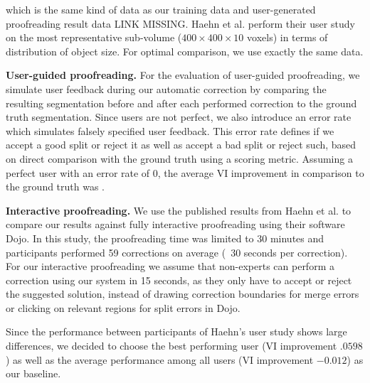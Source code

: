 

which is the same kind of data as our training data and user-generated proofreading result data LINK MISSING.
Haehn et al. perform their user study on the most representative sub-volume ($400\times400\times10$ voxels) in terms of distribution of object size. For optimal comparison, we use exactly the same data.

\textbf{User-guided proofreading.} For the evaluation of user-guided proofreading, we simulate user feedback during our automatic correction by comparing the resulting segmentation before and after each performed correction to the ground truth segmentation. Since users are not perfect, we also introduce an error rate which simulates falsely specified user feedback. This error rate defines if we accept a good split or reject it as well as accept a bad split or reject such, based on direct comparison with the ground truth using a scoring metric. Assuming a perfect user with an error rate of 0, the average VI improvement in comparison to the ground truth was .

\textbf{Interactive proofreading.} We use the published results from Haehn et al. to compare our results against fully interactive proofreading using their software Dojo. In this study, the proofreading time was limited to 30 minutes and participants performed 59 corrections on average (~30 seconds per correction). For our interactive proofreading we assume that  non-experts can perform a correction using our system in 15 seconds, as they only have to accept or reject the suggested solution, instead of drawing correction boundaries for merge errors or clicking on relevant regions for split errors in Dojo. 

Since the performance between participants of Haehn's user study shows large differences, we decided to choose the best performing user (VI improvement $.0598$) as well as the average performance among all users (VI improvement $-0.012$) as our baseline.

